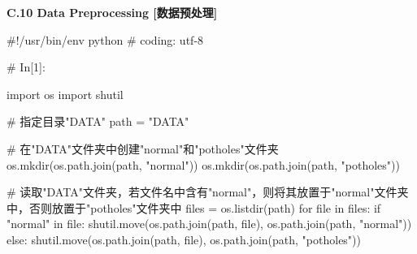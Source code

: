 \documentclass{MathorCupmodeling}
\begin{document}
\textbf{C.10 Data Preprocessing [数据预处理]}
\begin{python}
#!/usr/bin/env python
# coding: utf-8

# In[1]:


import os
import shutil

# 指定目录"DATA"
path = "DATA"

# 在"DATA"文件夹中创建"normal"和"potholes"文件夹
os.mkdir(os.path.join(path, "normal"))
os.mkdir(os.path.join(path, "potholes"))

# 读取"DATA"文件夹，若文件名中含有"normal"，则将其放置于"normal"文件夹中，否则放置于"potholes"文件夹中
files = os.listdir(path)
for file in files:
    if "normal" in file:
        shutil.move(os.path.join(path, file), os.path.join(path, "normal"))
    else:
        shutil.move(os.path.join(path, file), os.path.join(path, "potholes"))

\end{python}
\end{document}
